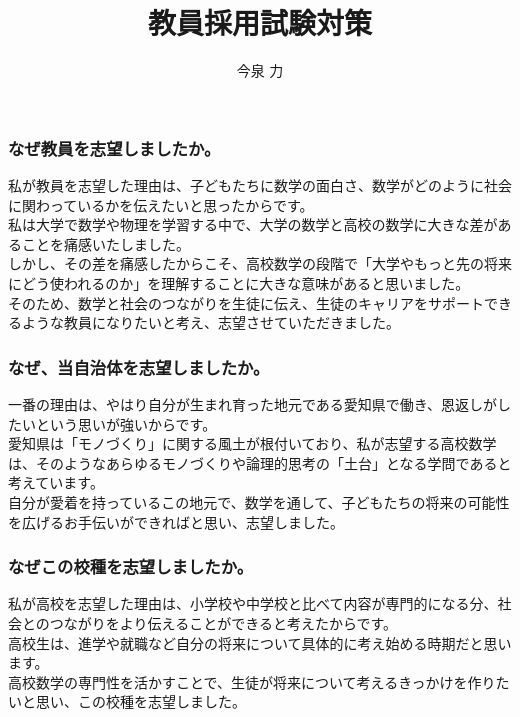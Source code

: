 \documentclass[11pt]{beamer}
\title{教員採用試験対策}
\author{今泉 力}
\newcommand{\widespacing}{\linespread{1.5}\selectfont}
\begin{document}
\begin{frame}
  \titlepage
\end{frame}

\begin{frame}
  \frametitle{なぜ教員を志望しましたか。}
  {\widespacing
  私が教員を志望した理由は、子どもたちに数学の面白さ、数学がどのように社会に関わっているかを伝えたいと思ったからです。\\
  私は大学で数学や物理を学習する中で、大学の数学と高校の数学に大きな差があることを痛感いたしました。\\
  しかし、その差を痛感したからこそ、高校数学の段階で「大学やもっと先の将来にどう使われるのか」を理解することに大きな意味があると思いました。\\
  そのため、数学と社会のつながりを生徒に伝え、生徒のキャリアをサポートできるような教員になりたいと考え、志望させていただきました。
  }
\end{frame}

\begin{frame}
  \frametitle{なぜ、当自治体を志望しましたか。}
  {\widespacing
  一番の理由は、やはり自分が生まれ育った地元である愛知県で働き、恩返しがしたいという思いが強いからです。\\
  愛知県は「モノづくり」に関する風土が根付いており、私が志望する高校数学は、そのようなあらゆるモノづくりや論理的思考の「土台」となる学問であると考えています。\\
  自分が愛着を持っているこの地元で、数学を通して、子どもたちの将来の可能性を広げるお手伝いができればと思い、志望しました。\\
  }
\end{frame}

\begin{frame}
\frametitle{なぜこの校種を志望しましたか。}
{\widespacing
私が高校を志望した理由は、小学校や中学校と比べて内容が専門的になる分、社会とのつながりをより伝えることができると考えたからです。\\
高校生は、進学や就職など自分の将来について具体的に考え始める時期だと思います。\\
高校数学の専門性を活かすことで、生徒が将来について考えるきっかけを作りたいと思い、この校種を志望しました。\\
}
\end{frame}
\end{document}
